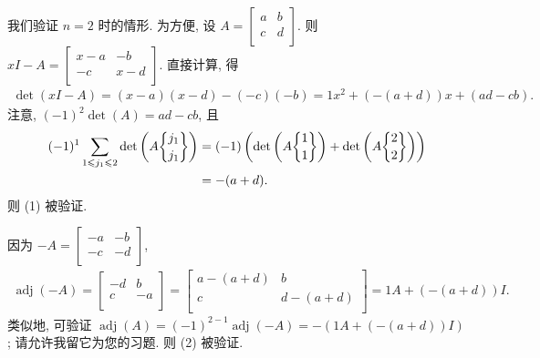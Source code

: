 \documentclass[../libro.tex]{subfiles}
\begin{document}
\begin{example}
    我们验证 \(n = 2\) 时的情形.
    为方便, 设
    \(A =
        \begin{bmatrix}
            a & b \\
            c & d \\
    \end{bmatrix}\).
    则
    \(xI - A =
        \begin{bmatrix}
            x - a & -b    \\
            -c    & x - d \\
    \end{bmatrix}\).
    直接计算, 得
    \begin{align*}
        \det {(xI - A)}
        = (x - a)(x - d) - (-c)(-b)
        = 1x^2 + (-(a + d))x + (ad - cb).
    \end{align*}
    注意, \((-1)^2 \det {(A)} = ad - cb\),
    且
    \begin{align*}
        (-1)^1
        \sum_{1 \leq j_1 \leq 2}
        \det {\left(
                A \submat{j_1}{j_1}
        \right)}
        = {} &
        (-1) \left(
            \det {\left(
                    A \submat{1}{1}
            \right)}
            +
            \det {\left(
                    A \submat{2}{2}
            \right)}
        \right)
        \\
        = {} &
        {-} (a + d).
    \end{align*}
    则 (1) 被验证.

    因为
    \(-A =
        \begin{bmatrix}
            -a & -b \\
            -c & -d \\
    \end{bmatrix}\),
    \begin{align*}
        \operatorname{adj} {(-A)}
        =
        \begin{bmatrix}
            -d & b  \\
            c  & -a \\
        \end{bmatrix}
        =
        \begin{bmatrix}
            a - (a+d) & b         \\
            c         & d - (a+d) \\
        \end{bmatrix}
        =
        1A + (-(a+d))I.
    \end{align*}
    类似地, 可验证
    \(\operatorname{adj} {(A)}
        = (-1)^{2-1} \operatorname{adj} {(-A)}
    = -(1A + (-(a+d))I)\);
    请允许我留它为您的习题.
    则 (2) 被验证.


\end{example}
\end{document}

